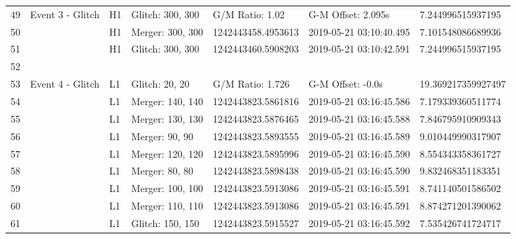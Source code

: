 \begin{longtable}{lllllll}
49   &                                   Event 3 - Glitch &       H1 &  Glitch: 300, 300 &     G/M Ratio: 1.02 &       G-M Offset: 2.095s &   7.244996515937195 \\
50   &                                                    &       H1 &  Merger: 300, 300 &  1242443458.4953613 &  2019-05-21 03:10:40.495 &   7.101548086689936 \\
51   &                                                    &       H1 &  Glitch: 300, 300 &  1242443460.5908203 &  2019-05-21 03:10:42.591 &   7.244996515937195 \\
52   &                                                    &          &                   &                     &                          &                     \\
53   &                                   Event 4 - Glitch &       L1 &    Glitch: 20, 20 &    G/M Ratio: 1.726 &        G-M Offset: -0.0s &  19.369217359927497 \\
54   &                                                    &       L1 &  Merger: 140, 140 &  1242443823.5861816 &  2019-05-21 03:16:45.586 &   7.179339360511774 \\
55   &                                                    &       L1 &  Merger: 130, 130 &  1242443823.5876465 &  2019-05-21 03:16:45.588 &   7.846795910909343 \\
56   &                                                    &       L1 &    Merger: 90, 90 &  1242443823.5893555 &  2019-05-21 03:16:45.589 &   9.010449990317907 \\
57   &                                                    &       L1 &  Merger: 120, 120 &  1242443823.5895996 &  2019-05-21 03:16:45.590 &   8.554343358361727 \\
58   &                                                    &       L1 &    Merger: 80, 80 &  1242443823.5898438 &  2019-05-21 03:16:45.590 &   9.832468351183351 \\
59   &                                                    &       L1 &  Merger: 100, 100 &  1242443823.5913086 &  2019-05-21 03:16:45.591 &   8.741140501586502 \\
60   &                                                    &       L1 &  Merger: 110, 110 &  1242443823.5913086 &  2019-05-21 03:16:45.591 &   8.874271201390062 \\
61   &                                                    &       L1 &  Glitch: 150, 150 &  1242443823.5915527 &  2019-05-21 03:16:45.592 &   7.535426741724717 \\

\end{longtable}
